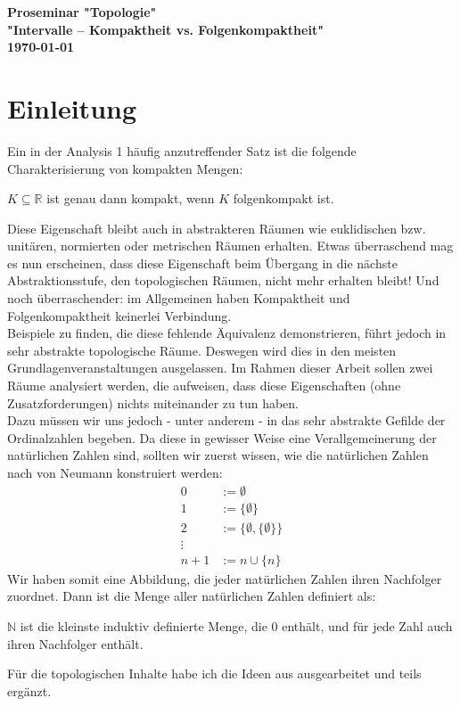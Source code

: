 \documentclass[11pt]{scrartcl}
\newcommand{\R}{\mathbb{R}}
\newcommand{\N}{\mathbb{N}}
\begin{document}
\begin{titlepage}
	\centering
	\Huge
	\textbf{Proseminar "Topologie" }\\
	\vspace*{1cm}
	\Large
	\textbf{"Intervalle -- Kompaktheit vs. Folgenkompaktheit"}\\
	\vspace*{2cm}
	\large
	\textbf{\today}
\end{titlepage}
\section{Einleitung}
Ein in der Analysis 1 häufig anzutreffender Satz ist die folgende Charakterisierung von kompakten Mengen:
\begin{theorem}
	$ K \subseteq \R$ ist genau dann kompakt, wenn $K$ folgenkompakt ist.
\end{theorem}
Diese Eigenschaft bleibt auch in abstrakteren Räumen wie euklidischen bzw. unitären, normierten oder metrischen Räumen erhalten. Etwas überraschend mag es nun erscheinen, dass diese Eigenschaft beim Übergang in die nächste Abstraktionsstufe, den topologischen Räumen, nicht mehr erhalten bleibt! Und noch überraschender: im Allgemeinen haben Kompaktheit und Folgenkompaktheit keinerlei Verbindung.\\
Beispiele zu finden, die diese fehlende Äquivalenz demonstrieren, führt jedoch in sehr abstrakte topologische Räume. Deswegen wird dies in den meisten Grundlagenveranstaltungen ausgelassen. 
Im Rahmen dieser Arbeit sollen zwei Räume analysiert werden, die aufweisen, dass diese Eigenschaften (ohne Zusatzforderungen) nichts miteinander zu
tun haben.\\
Dazu müssen wir uns jedoch - unter anderem - in das sehr abstrakte Gefilde der Ordinalzahlen begeben. Da diese in gewisser Weise eine Verallgemeinerung der natürlichen Zahlen sind, sollten wir zuerst wissen, wie die natürlichen Zahlen nach von Neumann konstruiert werden:
\begin{align*}
	0 &:= \emptyset \\
	1 &:= \{\emptyset\}\\
	2 &:= \{\emptyset, \{\emptyset\}\}\\
	\vdots \\
	n+1 &:= n \cup \{ n\}
\end{align*}
Wir haben somit eine Abbildung, die jeder natürlichen Zahlen ihren Nachfolger zuordnet. Dann ist die Menge aller natürlichen Zahlen definiert als:
\begin{definition}
	$\N$ ist die kleinste induktiv definierte Menge, die $0$ enthält, und für jede Zahl auch ihren 
	Nachfolger enthält.
\end{definition}
\noindent Für die topologischen Inhalte habe ich die Ideen aus  ausgearbeitet und teils ergänzt.
\end{document}
